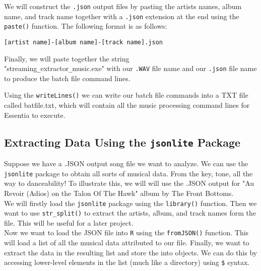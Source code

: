 \documentclass{article}\usepackage[]{graphicx}\usepackage[]{xcolor}
\begin{document}
\begin{multicols}{2}
We will construct the \texttt{.json} output files by pasting the artists names, album name, and track name
together with a \texttt{.json} extension at the end using the \texttt{paste()} function.
The following format is as follows:

\begin{center}
\begin{footnotesize}
\texttt{[artist name]-[album name]-[track name].json}
\end{footnotesize}
\end{center}

Finally, we will paste together the string \\
"streaming\verb|_|extractor\verb|_|music.exe" with our \texttt{.WAV} file
name and our \texttt{.json} file name to produce the batch file command lines.

Using the \texttt{writeLines()} we can write our batch file commands into a TXT file called batfile.txt,
which will contain all the music processing command lines for Essentia to execute.

\subsection{Extracting Data Using the \texttt{jsonlite} Package}
Suppose we have a .JSON output song file we want to analyze. We can use the \texttt{jsonlite} package to obtain
all sorts of musical data. From the key, tone, all the way to danceability!
To illustrate this, we will will use the .JSON output for "Au Revoir (Adios) on the Talon Of The Hawk" album by The Front Bottoms. \\

We will firstly load the \texttt{jsonlite} package using the \texttt{library()} function. Then we want to use
\texttt{str}\verb|_|\texttt{split()} to extract the artists, album, and track names form the file. This will
be useful for a later project.  \\

Now we want to load the JSON file into \texttt{R} using the \texttt{fromJSON()} function. This will load a list
of all the musical data attributed to our file.
Finally, we want to extract the data in the resulting list and store the into objects. We can do this by
accessing lower-level elements in the list (much like a directory) using \verb|$| syntax.

\columnbreak


\end{multicols}
\end{document}
